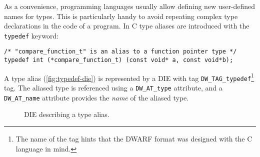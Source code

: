 As a convenience, programming languages usually allow defining new user-defined
names for types. This is particularly handy to avoid repeating complex type
declarations in the code of a program. In C type aliases are introduced with
the \texttt{typedef} keyword:

\begin{verbatim}
/* "compare_function_t" is an alias to a function pointer type */
typedef int (*compare_function_t) (const void* a, const void*b);
\end{verbatim}

A type alias (\autoref{fig:typedef-die}) is represented by a DIE with tag
\verb|DW_TAG_typedef|\footnote{The name of the tag hints that
the DWARF format was designed with the C language in mind.} tag. The aliased
type is referenced using a \verb|DW_AT_type| attribute, and
a \verb|DW_AT_name| attribute provides the \emph{name} of the aliased type.

\begin{figure}
  \centering
  \caption{DIE describing a type alias.}
  \label{fig:typedef-die}
\end{figure}



